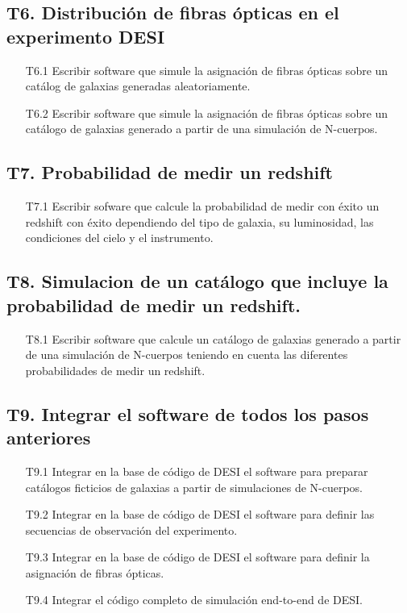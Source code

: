 \subsection*{T6. Distribuci\'on de fibras \'opticas en el experimento DESI}
\begin{itemize}
\item[T6.1] \prof Escribir software que simule la asignaci\'on de fibras
  \'opticas sobre un cat\'alog de galaxias generadas aleatoriamente. 
\item[T6.2] \prof Escribir software que simule la asignaci\'on de fibras
  \'opticas sobre un cat\'alogo de galaxias generado a partir de una
  simulaci\'on de N-cuerpos. 
\end{itemize}

\subsection*{T7. Probabilidad de medir un redshift}
\begin{itemize}
\item[T7.1] \prof Escribir sofware que calcule la probabilidad de
  medir con \'exito un redshift con \'exito dependiendo del tipo de
  galaxia, su luminosidad, las condiciones del cielo y el instrumento.
\end{itemize}

\subsection*{T8. Simulacion de un cat\'alogo que incluye la
  probabilidad de medir un redshift.}
\begin{itemize}
\item[T8.1] \prof Escribir software que calcule un cat\'alogo de galaxias
  generado a partir de una simulaci\'on de N-cuerpos teniendo en
  cuenta las diferentes probabilidades de medir un redshift.
\end{itemize}

\subsection*{T9. Integrar el software de todos los pasos anteriores}
\begin{itemize}
\item[T9.1] \gradB\prof Integrar en la base de c\'odigo de DESI el software para
  preparar cat\'alogos ficticios de galaxias a partir de simulaciones
  de N-cuerpos. 
\item[T9.2] \gradB\prof Integrar en la base de c\'odigo de DESI el software para
  definir las secuencias de observaci\'on del experimento.

\item[T9.3] \gradB\prof Integrar en la base de c\'odigo de DESI el software para
  definir la asignaci\'on de fibras \'opticas.
\item[T9.4] \gradB\prof Integrar el c\'odigo completo de simulaci\'on end-to-end
  de DESI. 
\end{itemize}

